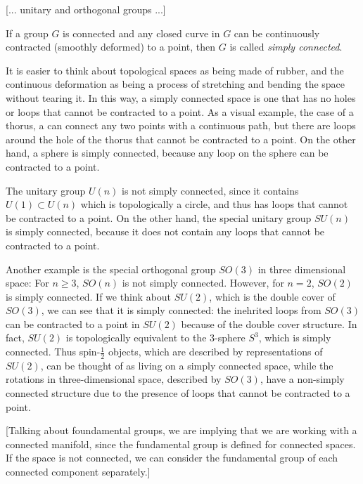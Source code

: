     [... unitary and orthogonal groups ...]

\begin{definition}
    If a group \(G\) is connected and any closed curve in \(G\) can be continuously contracted (smoothly deformed) to a point, then \(G\) is called \textit{simply connected}.
\end{definition}

It is easier to think about topological spaces as being made of rubber, and the continuous deformation as being a process of stretching and bending the space without tearing it. In this way, a simply connected space is one that has no holes or loops that cannot be contracted to a point. As a visual example, the case of a thorus, a can connect any two points with a continuous path, but there are loops around the hole of the thorus that cannot be contracted to a point. On the other hand, a sphere is simply connected, because any loop on the sphere can be contracted to a point.

\begin{example}
    The unitary group \(U(n)\) is not simply connected, since it contains \(U(1) \subset U(n)\) which is topologically a circle, and thus has loops that cannot be contracted to a point. On the other hand, the special unitary group \(SU(n)\) is simply connected, because it does not contain any loops that cannot be contracted to a point.

    Another example is the special orthogonal group \(SO(3)\) in three dimensional space: For \(n \geq 3\), \(SO(n)\) is not simply connected. However, for \(n = 2\), \(SO(2)\) is simply connected. If we think about \(SU(2)\), which is the double cover of \(SO(3)\), we can see that it is simply connected: the inehrited loops from \(SO(3)\) can be contracted to a point in \(SU(2)\) because of the double cover structure. In fact, \(SU(2)\) is topologically equivalent to the 3-sphere \(S^3\), which is simply connected. Thus spin-\(\tfrac{1}{2}\) objects, which are described by representations of \(SU(2)\), can be thought of as living on a simply connected space, while the rotations in three-dimensional space, described by \(SO(3)\), have a non-simply connected structure due to the presence of loops that cannot be contracted to a point.
\end{example}

[Talking about foundamental groups, we are implying that we are working with a connected manifold, since the fundamental group is defined for connected spaces. If the space is not connected, we can consider the fundamental group of each connected component separately.]

